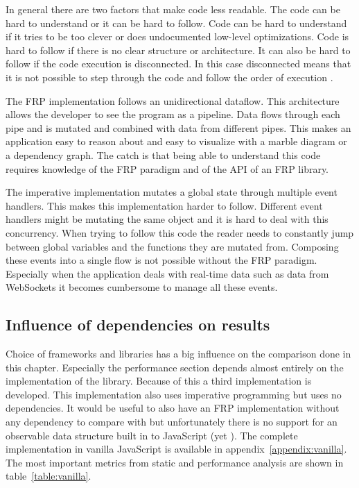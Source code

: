 In general there are two factors that make code less readable. The code can be hard to understand or it can be hard to follow. Code can be hard to understand if it tries to be too clever or does undocumented low-level optimizations. Code is hard to follow if there is no clear structure or architecture. It can also be hard to follow if the code execution is disconnected. In this case disconnected means that it is not possible to step through the code and follow the order of execution \cite{read}.

The FRP implementation follows an unidirectional dataflow. This architecture allows the developer to see the program as a pipeline. Data flows through each pipe and is mutated and combined with data from different pipes. This makes an application easy to reason about and easy to visualize with a marble diagram or a dependency graph. The catch is that being able to understand this code requires knowledge of the FRP paradigm and of the API of an FRP library.

The imperative implementation mutates a global state through multiple event handlers. This makes this implementation harder to follow. Different event handlers might be mutating the same object and it is hard to deal with this concurrency. When trying to follow this code the reader needs to constantly jump between global variables and the functions they are mutated from. Composing these events into a single flow is not possible without the FRP paradigm. Especially when the application deals with real-time data such as data from WebSockets it becomes cumbersome to manage all these events.

\subsection{Influence of dependencies on results}
\label{sec:inf}

Choice of frameworks and libraries has a big influence on the comparison done in this chapter. Especially the performance section depends almost entirely on the implementation of the library. Because of this a third implementation is developed. This implementation also uses imperative programming but uses no dependencies. It would be useful to also have an FRP implementation without any dependency to compare with but unfortunately there is no support for an observable data structure built in to JavaScript (yet \cite{tc39}). The complete implementation in vanilla JavaScript is available in appendix~\ref{appendix:vanilla}. The most important metrics from static and performance analysis are shown in table~\ref{table:vanilla}.

